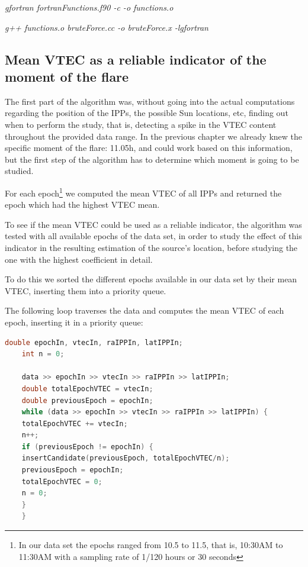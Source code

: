\textit{gfortran fortranFunctions.f90 -c -o functions.o}
	
\textit{g++ functions.o bruteForce.cc -o bruteForce.x -lgfortran}

\subsection{Mean VTEC as a reliable indicator of the moment of the flare}

The first part of the algorithm was, without going into the actual computations regarding the position of the IPPs, the possible Sun locations, etc, finding out when to perform the study, that is, detecting a spike in the VTEC content throughout the provided data range. 
In the previous chapter we already knew the specific moment of the flare: 11.05h, and could work based on this information, but the first step of the algorithm has to determine which moment is going to be studied.

For each epoch\footnote{In our data set the epochs ranged from 10.5 to 11.5, that is, 10:30AM to 11:30AM with a sampling rate of 1/120 hours or 30 seconds} we computed the mean VTEC of all IPPs and returned the epoch which had the highest VTEC mean.

To see if the mean VTEC could be used as a reliable indicator, the algorithm was tested with all available epochs of the data set, in order to study the effect of this indicator in the resulting estimation of the source's location, before studying the one with the highest coefficient in detail.

To do this we sorted the different epochs available in our data set by their mean VTEC, inserting them into a priority queue.

The following loop traverses the data and computes the mean VTEC of each epoch, inserting it in a priority queue:

\begin{minipage}{\linewidth}
	\begin{lstlisting}[language=c, caption=Finding a VTEC spike]
	double epochIn, vtecIn, raIPPIn, latIPPIn;
	int n = 0;
	
	data >> epochIn >> vtecIn >> raIPPIn >> latIPPIn;
	double totalEpochVTEC = vtecIn;
	double previousEpoch = epochIn;
	while (data >> epochIn >> vtecIn >> raIPPIn >> latIPPIn) {
	totalEpochVTEC += vtecIn;
	n++;
	if (previousEpoch != epochIn) {
	insertCandidate(previousEpoch, totalEpochVTEC/n);
	previousEpoch = epochIn;
	totalEpochVTEC = 0;
	n = 0;
	}
	}
	\end{lstlisting}
\end{minipage}

